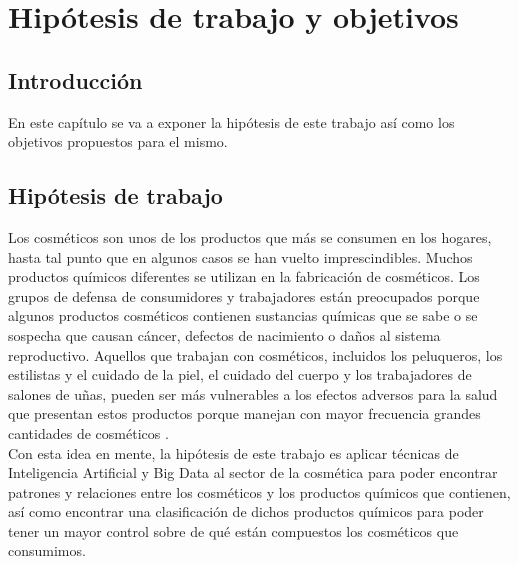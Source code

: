 
\chapter{Hipótesis de trabajo y objetivos} %
\label{chap:job-hypothesis} %


\section{Introducción}
En este capítulo se va a exponer la hipótesis de este trabajo así como los objetivos propuestos para el mismo.



\section{Hipótesis de trabajo}
Los cosméticos son unos de los productos que más se consumen en los hogares, hasta tal punto que en algunos casos se han vuelto imprescindibles. Muchos productos químicos diferentes se utilizan en la fabricación de cosméticos. Los grupos de defensa de consumidores y trabajadores están preocupados porque algunos productos cosméticos contienen sustancias químicas que se sabe o se sospecha que causan cáncer, defectos de nacimiento o daños al sistema reproductivo. Aquellos que trabajan con cosméticos, incluidos los peluqueros, los estilistas y el cuidado de la piel, el cuidado del cuerpo y los trabajadores de salones de uñas, pueden ser más vulnerables a los efectos adversos para la salud que presentan estos productos porque manejan con mayor frecuencia grandes cantidades de cosméticos \citep{dataset}. \\

Con esta idea en mente, la hipótesis de este trabajo es aplicar técnicas de Inteligencia Artificial y Big Data al sector de la cosmética para poder encontrar patrones y relaciones entre los cosméticos y los productos químicos que contienen, así como encontrar una clasificación de dichos productos químicos para poder tener un mayor control sobre de qué están compuestos los cosméticos que consumimos. \\





